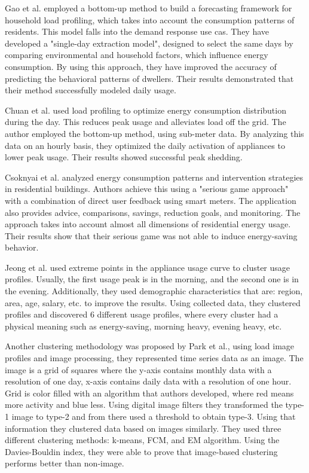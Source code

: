 Gao et al.\cite{Gao2018} employed a bottom-up method to build a forecasting framework for household load profiling, which takes into account the consumption patterns of residents. 
This model falls into the demand response use cas.
They have developed a "single-day extraction model", designed to select the same days by comparing environmental and household factors, which influence energy consumption.
By using this approach, they have improved the accuracy of predicting the behavioral patterns of dwellers. 
Their results demonstrated that their method successfully modeled daily usage.

Chuan et al.\cite{Chuan2014} used load profiling to optimize energy consumption distribution during the day.
This reduces peak usage and alleviates load off the grid. The author employed the bottom-up method, using sub-meter data.
By analyzing this data on an hourly basis, they optimized the daily activation of appliances to lower peak usage. 
Their results showed successful peak shedding.

Csoknyai et al.\cite{Csoknyai2019} analyzed energy consumption patterns and intervention strategies in residential buildings.
Authors achieve this using a "serious game approach" with a combination of direct user feedback using smart meters. 
The application also provides advice, comparisons, savings, reduction goals, and monitoring.
The approach takes into account almost all dimensions of residential energy usage. 
Their results show that their serious game was not able to induce energy-saving behavior.

Jeong et al.\cite{Jeong2021} used extreme points in the appliance usage curve to cluster usage profiles.
Usually, the first usage peak is in the morning, and the second one is in the evening. 
Additionally, they used demographic characteristics that are: region, area, age, salary, etc. to improve the results.
Using collected data, they clustered profiles and discovered 6 different usage profiles, 
where every cluster had a physical meaning such as energy-saving, morning heavy, evening heavy, etc.

Another clustering methodology was proposed by Park et al.\cite{Park2019}, using load image profiles and image processing, they represented time series data as an image. 
The image is a grid of squares where the y-axis contains monthly data with a resolution of one day,
x-axis contains daily data with a resolution of one hour. Grid is color filled with an algorithm that authors developed,
where red means more activity and blue less. Using digital image filters they transformed the type-1 image to type-2 and from there
used a threshold to obtain type-3. Using that information they clustered data based on images similarly. They used three different 
clustering methods: k-means, FCM, and EM algorithm. Using the Davies-Bouldin index, they were able to prove that image-based clustering performs better than non-image.

